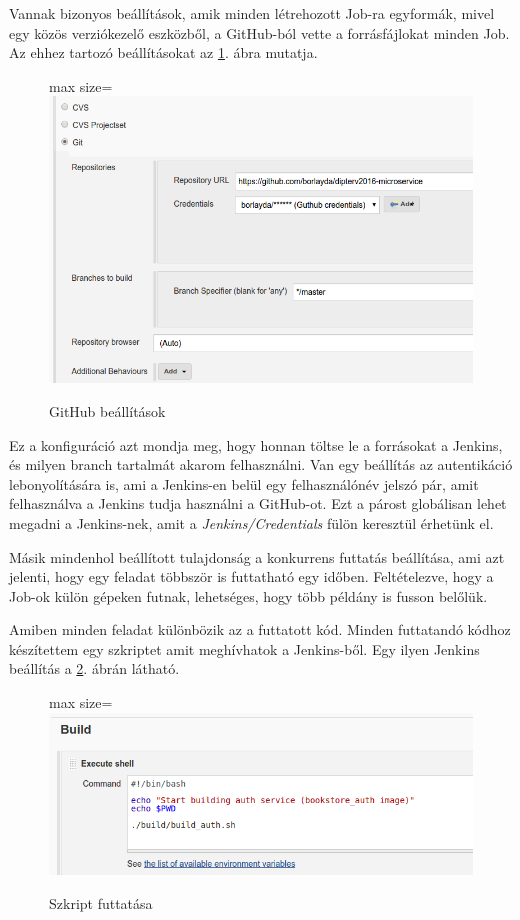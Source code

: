 \documentclass[11pt,magyar,a4paper,twoside,]{report}
\let\Oldincludegraphics\includegraphics
\renewcommand{\includegraphics}[1]{
\begin{adjustbox}{max size={\textwidth}{\textheight}}
    \Oldincludegraphics[scale=0.6]{#1}%
\end{adjustbox}
}
\begin{document}
Vannak bizonyos beállítások, amik minden létrehozott Job-ra egyformák,
mivel egy közös verziókezelő eszközből, a GitHub-ból vette a
forrásfájlokat minden Job. Az ehhez tartozó beállításokat az
\ref{github-conf}. ábra mutatja.

\begin{figure}[H]
\centering
\includegraphics{img/github-config.png}
\caption{GitHub beállítások\label{github-conf}}
\end{figure}

Ez a konfiguráció azt mondja meg, hogy honnan töltse le a forrásokat a
Jenkins, és milyen branch tartalmát akarom felhasználni. Van egy
beállítás az autentikáció lebonyolítására is, ami a Jenkins-en belül egy
felhasználónév jelszó pár, amit felhasználva a Jenkins tudja használni a
GitHub-ot. Ezt a párost globálisan lehet megadni a Jenkins-nek, amit a
\emph{Jenkins/Credentials} fülön keresztül érhetünk el.

Másik mindenhol beállított tulajdonság a konkurrens futtatás beállítása,
ami azt jelenti, hogy egy feladat többször is futtatható egy időben.
Feltételezve, hogy a Job-ok külön gépeken futnak, lehetséges, hogy több
példány is fusson belőlük.

Amiben minden feladat különbözik az a futtatott kód. Minden futtatandó
kódhoz készítettem egy szkriptet amit meghívhatok a Jenkins-ből. Egy
ilyen Jenkins beállítás a \ref{script-run}. ábrán látható.

\begin{figure}[H]
\centering
\includegraphics{img/script-run.png}
\caption{Szkript futtatása\label{script-run}}
\end{figure}
\end{document}
